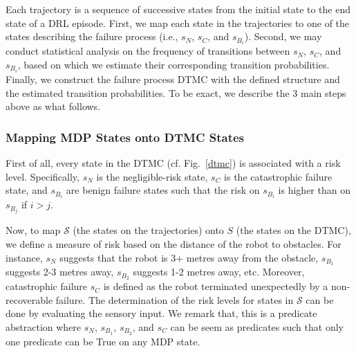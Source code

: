 Each trajectory is a sequence of successive states %
from the initial state to the end state of a DRL episode. First, we map each state in the trajectories to one of the states describing the failure process (i.e., $s_N$, $s_C$, and $s_{B_i}$). Second, we may conduct statistical analysis on the frequency of transitions between $s_N$, $s_C$, and $s_{B_i}$, based on which we 
estimate their corresponding transition probabilities. Finally, we construct the failure process DTMC with the defined structure and the estimated transition probabilities.
To be exact, we describe the 3 main steps above as what follows.



\subsubsection{Mapping MDP States onto DTMC States}

% 
First of all, every state in the DTMC (cf. Fig.~\ref{dtmc}) is associated with a risk level. Specifically, $s_N$ is the negligible-risk state, $s_C$ is the catastrophic
failure state, and $s_{B_i}$ are benign failure states such that the risk on $s_{B_i}$ is higher than on $s_{B_j}$ if $i>j$. 

Now, to map $\mathcal{S}$ (the states on the trajectories) onto $S$ (the states on the DTMC), we define a measure of risk based on the distance of the robot to obstacles. 
%
For instance, $s_N$ suggests that the robot is 3+ metres away from the obstacle, $s_{B_1}$ suggests 2-3 metres away, 
$s_{B_2}$ suggests 1-2 metres away, etc.  %
Moreover, catastrophic failure $s_C$ is defined as the robot terminated unexpectedly by a non-recoverable failure.  The determination of the risk levels for states in $\mathcal{S}$ can be done by evaluating the sensory input. We remark that, this is a predicate abstraction where $s_N$, $s_{B_1}$, $s_{B_2}$, and $s_C$ can be seem as predicates such that only one predicate can be True on any MDP state. 

